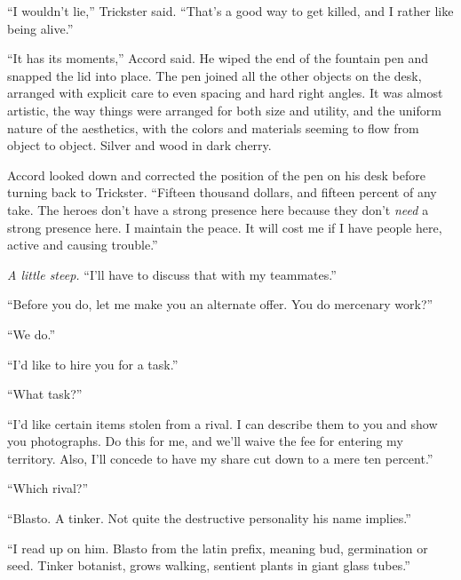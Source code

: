 ``I wouldn't lie,'' Trickster said.  ``That's a good way to get killed, and I rather like being alive.''



``It has its moments,'' Accord said.  He wiped the end of the fountain pen and snapped the lid into place.  The pen joined all the other objects on the desk, arranged with explicit care to even spacing and hard right angles.  It was almost artistic, the way things were arranged for both size and utility, and the uniform nature of the aesthetics, with the colors and materials seeming to flow from object to object.  Silver and wood in dark cherry.



Accord looked down and corrected the position of the pen on his desk before turning back to Trickster.  ``Fifteen thousand dollars, and fifteen percent of any take.  The heroes don't have a strong presence here because they don't \emph{need} a strong presence here.  I maintain the peace.  It will cost me if I have people here, active and causing trouble.''



\emph{A little steep.}  ``I'll have to discuss that with my teammates.''



``Before you do, let me make you an alternate offer.  You do mercenary work?''



``We do.''



``I'd like to hire you for a task.''



``What task?''



``I'd like certain items stolen from a rival.  I can describe them to you and show you photographs.  Do this for me, and we'll waive the fee for entering my territory.  Also, I'll concede to have my share cut down to a mere ten percent.''



``Which rival?''



``Blasto.  A tinker.  Not quite the destructive personality his name implies.''



``I read up on him.  Blasto from the latin prefix, meaning bud, germination or seed.  Tinker botanist, grows walking, sentient plants in giant glass tubes.''



